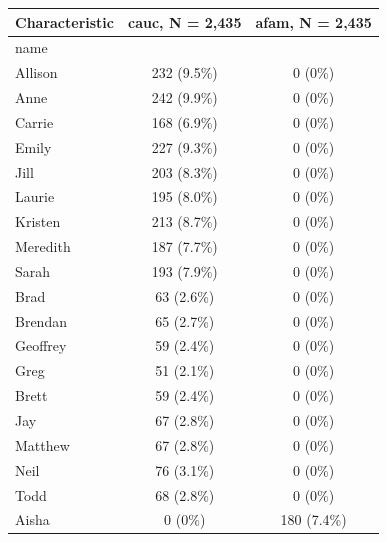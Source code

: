\documentclass[
  11pt,
]{book}
\numberwithin{equation}{section}
\numberwithin{countremarque}{section}
\begin{document}
\begin{longtable}{lcc}
\toprule
\textbf{Characteristic} & \textbf{cauc}, N = 2,435 & \textbf{afam}, N = 2,435\\
\midrule
name &  & \\
\hspace{1em}Allison & 232 (9.5\%) & 0 (0\%)\\
\hspace{1em}Anne & 242 (9.9\%) & 0 (0\%)\\
\hspace{1em}Carrie & 168 (6.9\%) & 0 (0\%)\\
\hspace{1em}Emily & 227 (9.3\%) & 0 (0\%)\\
\addlinespace
\hspace{1em}Jill & 203 (8.3\%) & 0 (0\%)\\
\hspace{1em}Laurie & 195 (8.0\%) & 0 (0\%)\\
\hspace{1em}Kristen & 213 (8.7\%) & 0 (0\%)\\
\hspace{1em}Meredith & 187 (7.7\%) & 0 (0\%)\\
\hspace{1em}Sarah & 193 (7.9\%) & 0 (0\%)\\
\addlinespace
\hspace{1em}Brad & 63 (2.6\%) & 0 (0\%)\\
\hspace{1em}Brendan & 65 (2.7\%) & 0 (0\%)\\
\hspace{1em}Geoffrey & 59 (2.4\%) & 0 (0\%)\\
\hspace{1em}Greg & 51 (2.1\%) & 0 (0\%)\\
\hspace{1em}Brett & 59 (2.4\%) & 0 (0\%)\\
\addlinespace
\hspace{1em}Jay & 67 (2.8\%) & 0 (0\%)\\
\hspace{1em}Matthew & 67 (2.8\%) & 0 (0\%)\\
\hspace{1em}Neil & 76 (3.1\%) & 0 (0\%)\\
\hspace{1em}Todd & 68 (2.8\%) & 0 (0\%)\\
\hspace{1em}Aisha & 0 (0\%) & 180 (7.4\%)\\

\end{longtable}
\end{document}
